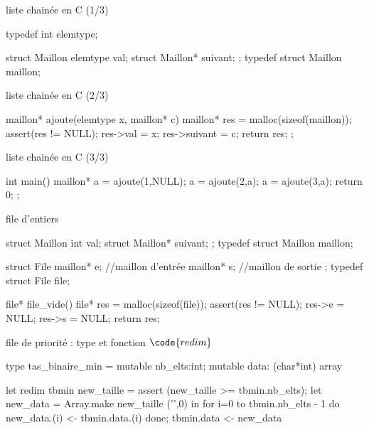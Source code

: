 \begin{adjustwidth}{-3cm}{-3cm}
\begin{implementation}{liste chainée en C (1/3)}
    \begin{lstC}
    typedef int elemtype;

    struct Maillon{
        elemtype val;
        struct Maillon* suivant;
    };
    typedef struct Maillon maillon;

    \end{lstC}
\end{implementation}

\begin{implementation}{liste chainée en C (2/3)}
    \begin{lstC}
    maillon* ajoute(elemtype x, maillon* c){
        maillon* res = malloc(sizeof(maillon));
        assert(res != NULL);
        res->val = x;
        res->suivant = c;
        return res;
    };
    \end{lstC}
\end{implementation}

\begin{implementation}{liste chainée en C (3/3)}
    \begin{lstC}
    int main(){
        maillon* a = ajoute(1,NULL);
        a = ajoute(2,a);
        a = ajoute(3,a);
        return 0;
    };
    \end{lstC}
\end{implementation}

\begin{implementation}{file d'entiers}
    \begin{lstC}
    struct Maillon{
        int val;
        struct Maillon* suivant;
    };
    typedef struct Maillon maillon;

    struct File{
        maillon* e; //maillon d'entrée
        maillon* s; //maillon de sortie
    };
    typedef struct File file;

    file* file_vide(){
        file* res = malloc(sizeof(file));
        assert(res != NULL);
        res->e = NULL;
        res->s = NULL;
        return res;
    }
    \end{lstC}
\end{implementation}

\begin{implementation}{file de priorité : type et fonction $\code{redim}$}
    \begin{lstOCaml}
    type tas_binaire_min = {
        mutable nb_elts:int; 
        mutable data: (char*int) array
    }

    let redim tbmin new_taille = 
        assert (new_taille >= tbmin.nb_elts);
        let new_data = Array.make new_taille ('',0) in
        for i=0 to tbmin.nb_elts - 1 do
            new_data.(i) <- tbmin.data.(i)
        done;
        tbmin.data <- new_data
    \end{lstOCaml}
\end{implementation}


\end{adjustwidth}
